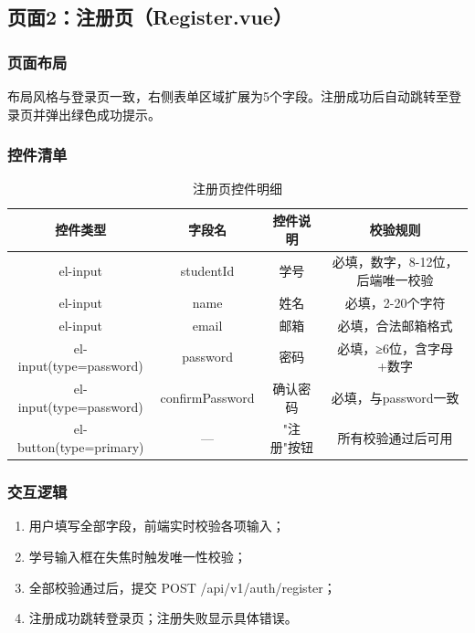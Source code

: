 \documentclass{../../softeng}
\begin{document}
\subsection{页面2：注册页（Register.vue）}

\subsubsection{页面布局}
布局风格与登录页一致，右侧表单区域扩展为5个字段。注册成功后自动跳转至登录页并弹出绿色成功提示。

\subsubsection{控件清单}
\begin{table}[htbp]
    \centering
    \caption{注册页控件明细}
    \begin{tabular}{|c|c|c|c|}
        \hline
        \textbf{控件类型} & \textbf{字段名} & \textbf{控件说明} & \textbf{校验规则} \\
        \hline
        el-input & studentId & 学号 & 必填，数字，8-12位，后端唯一校验 \\
        \hline
        el-input & name & 姓名 & 必填，2-20个字符 \\
        \hline
        el-input & email & 邮箱 & 必填，合法邮箱格式 \\
        \hline
        el-input(type=password) & password & 密码 & 必填，≥6位，含字母+数字 \\
        \hline
        el-input(type=password) & confirmPassword & 确认密码 & 必填，与password一致 \\
        \hline
        el-button(type=primary) & — & "注 册"按钮 & 所有校验通过后可用 \\
        \hline
    \end{tabular}
\end{table}

\subsubsection{交互逻辑}
\begin{enumerate}
    \item 用户填写全部字段，前端实时校验各项输入；
    \item 学号输入框在失焦时触发唯一性校验；
    \item 全部校验通过后，提交 POST /api/v1/auth/register；
    \item 注册成功跳转登录页；注册失败显示具体错误。
\end{enumerate}
\end{document}
